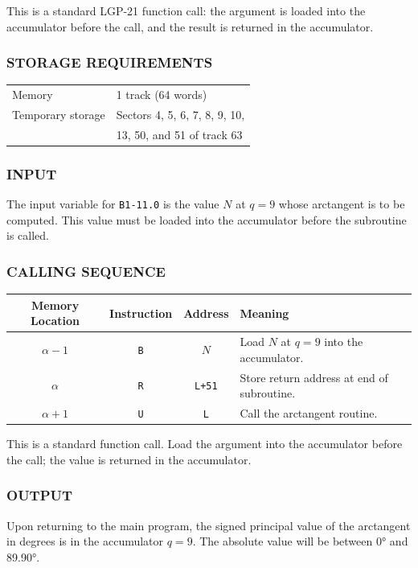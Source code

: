 This is a standard LGP-21 function call: the argument is loaded into the accumulator before the call, and the result is returned in the accumulator.

\subsubsection*{STORAGE REQUIREMENTS}
\begin{center}
\begin{tabular}{ll}
    \toprule
    Memory & 1 track (64 words) \\
    Temporary storage & Sectors 4, 5, 6, 7, 8, 9, 10, \\
     & 13, 50, and 51 of track 63 \\
    \bottomrule
\end{tabular}
\end{center}

\subsubsection*{INPUT}
The input variable for \texttt{B1-11.0} is the value $N$ at $q=9$ whose arctangent is to be computed. This value must be loaded into the accumulator before the subroutine is called.

\subsubsection*{CALLING SEQUENCE}
\begin{table}[h!]
\centering
\begin{tabularx}{\textwidth}{cccX}
\toprule
\textbf{Memory Location} & \textbf{Instruction} & \textbf{Address} & \textbf{Meaning} \\
\midrule
$\alpha-1$      & \texttt{B}            & $N$       & Load $N$ at $q=9$ into the accumulator.\\
$\alpha$      & \texttt{R}            & \texttt{L+51}    & Store return address at end of subroutine.\\
$\alpha+1$      & \texttt{U}            & \texttt{L}       & Call the arctangent routine.\\
\bottomrule
\end{tabularx}
\end{table}

This is a standard function call. Load the argument into the accumulator before the call; the value is returned in the accumulator.

\subsubsection*{OUTPUT}
Upon returning to the main program, the signed principal value of the arctangent in degrees is in the accumulator $q=9$. The absolute value will be between 0° and 89.90°.


